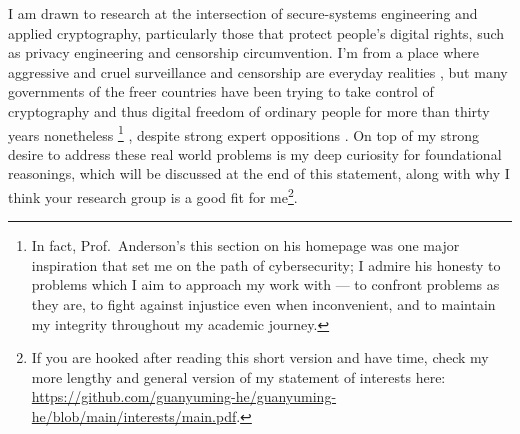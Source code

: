 \documentclass[10pt]{article}
\begin{document}
I am drawn to research at the intersection of secure-systems engineering and
applied cryptography, particularly those that protect people's digital rights,
such as privacy engineering and censorship circumvention. I'm from a place
where aggressive and cruel surveillance and censorship are everyday realities
\cite{internet.coup},
but many governments of the freer countries have been trying to take control of
cryptography and thus digital freedom of ordinary people for more than thirty
years nonetheless \cite{anderson.freedom, review.crypto.war}\footnote{In fact,
	Prof.~Anderson's this section \cite{anderson.freedom} on his homepage was
	one major inspiration that set me on the path of cybersecurity; I admire
	his honesty to problems which I aim to approach my work with --- to
	confront problems as they are, to fight against injustice even when
inconvenient, and to maintain my integrity throughout my academic journey.} ,
despite strong expert oppositions \cite{keys.under.doormats,
bugs.in.our.pockets, chatcontrolchildprotection}. On top of my strong desire to
address these real world problems is my deep curiosity for foundational
reasonings, which will be discussed at the end of this statement, along with
why I think your research group is a good fit for me\footnote{If you are hooked
	after reading this short version and have time,
	check my more lengthy and general version of my statement of interests
	here:
\url{https://github.com/guanyuming-he/guanyuming-he/blob/main/interests/main.pdf}.}.
\end{document}
